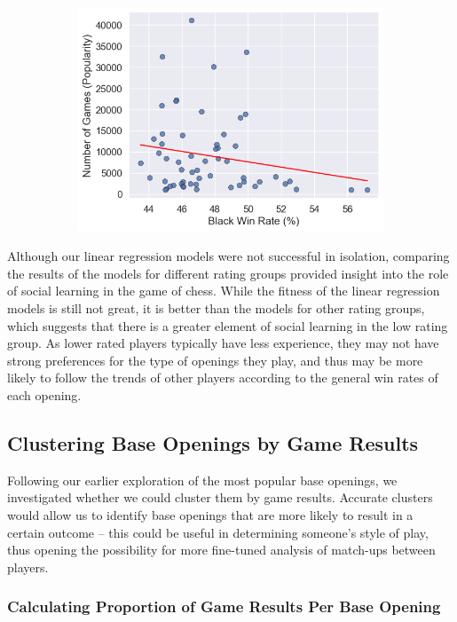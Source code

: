 \documentclass[a4paper, 11pt]{article}
\begin{document}
\begin{figure}[H]
\begin{subfigure}{0.49\textwidth}
        \includegraphics[width=\textwidth]{Popularity of Base Opening vs. Black Win Rate (Rated 1200-).png}
    \end{subfigure}
\end{figure}

Although our linear regression models were not successful in isolation, comparing the results of the models for different rating groups provided insight into the role of social learning in the game of chess. While the fitness of the linear regression models is still not great, it is better than the models for other rating groups, which suggests that there is a greater element of social learning in the low rating group. As lower rated players typically have less experience, they may not have strong preferences for the type of openings they play, and thus may be more likely to follow the trends of other players according to the general win rates of each opening.

\subsection{Clustering Base Openings by Game Results}
Following our earlier exploration of the most popular base openings, we investigated whether we could cluster them by game results. Accurate clusters would allow us to identify base openings that are more likely to result in a certain outcome -- this could be useful in determining someone's style of play, thus opening the possibility for more fine-tuned analysis of match-ups between players.

\subsubsection{Calculating Proportion of Game Results Per Base Opening}
\end{document}
